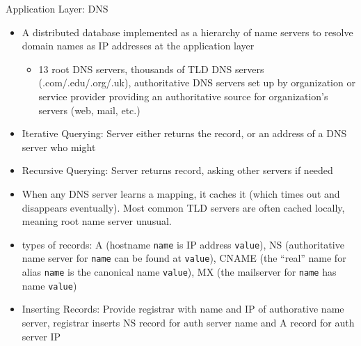 \documentclass{beamer}
\begin{document}
\begin{frame}[t]{Application Layer: DNS}
    \begin{itemize}
        \item A \alert{distributed database} implemented as a hierarchy of \alert{name servers} to \alert{resolve} domain names as IP addresses at the application layer
        \begin{itemize}
            \item 13 \alert{root} DNS servers, thousands of TLD DNS servers (.com/.edu/.org/.uk), \alert{authoritative} DNS servers set up by organization or service provider providing an authoritative source for organization's servers (web, mail, etc.)
        \end{itemize}
        \item \pause \alert{Iterative Querying}: Server either returns the record, or an address of a DNS server who might
        \item \pause \alert{Recursive Querying}: Server returns record, asking other servers if needed
        \item \pause When any DNS server learns a mapping, it \alert{caches} it (which times out and disappears eventually). Most common TLD servers are often cached locally, meaning root name server unusual.
        \item {} types of records: A (hostname \texttt{name} is IP address \texttt{value}), NS (authoritative name server for \texttt{name} can be found at \texttt{value}), CNAME (the ``real'' name for alias \texttt{name} is the canonical name \texttt{value}), MX (the mailserver for \texttt{name} has name \texttt{value})
        \item \pause Inserting Records: Provide registrar with name and IP of authorative name server, registrar inserts NS record for auth server name and A record for auth server IP
        
    \end{itemize}
\end{frame}
\end{document}
